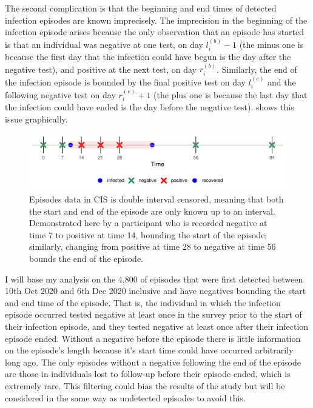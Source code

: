 \documentclass[thesis.tex]{subfiles}
\begin{document}
The second complication is that the beginning and end times of detected infection episodes are known imprecisely.
The imprecision in the beginning of the infection episode arises because the only observation that an episode has started is that an individual was negative at one test, on day $l_i^{(b)}-1$ (the minus one is because the first day that the infection could have begun is the day after the negative test), and positive at the next test, on day $r_i^{(b)}$.
Similarly, the end of the infection episode is bounded by the final positive test on day $l_i^{(e)}$ and the following negative test on day $r_i^{(e)}+1$ (the plus one is because the last day that the infection could have ended is the day before the negative test).
 shows this issue graphically.
\begin{figure}
  \centering \includegraphics{cis-perfect-testing/double-interval-censor}
  \caption[Double-interval censoring in CIS data]{Episodes data in CIS is double interval censored, meaning that both the start and end of the episode are only known up to an interval. Demonstrated here by a participant who is recorded negative at time 7 to positive at time 14, bounding the start of the episode; similarly, changing from positive at time 28 to negative at time 56 bounds the end of the episode. \label{perf-test:fig:double-interval-censor}}
\end{figure}

I will base my analysis on the 4,800 of episodes that were first detected between 10th Oct 2020 and 6th Dec 2020 inclusive and have negatives bounding the start and end time of the episode.
That is, the individual in which the infection episode occurred tested negative at least once in the survey prior to the start of their infection episode, and they tested negative at least once after their infection episode ended.
Without a negative before the episode there is little information on the episode's length because it's start time could have occurred arbitrarily long ago.
The only episodes without a negative following the end of the episode are those in individuals lost to follow-up before their episode ended, which is extremely rare.
This filtering could bias the results of the study but will be considered in the same way as undetected episodes to avoid this.
\end{document}
